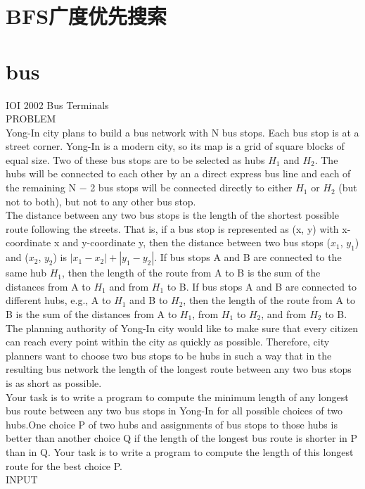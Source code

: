 \documentclass[12pt,twiside,a4paper]{ctexbook}
\numberwithin{chapter}{part}
\begin{document}
\section{BFS广度优先搜索}

\section{bus}
IOI 2002 Bus Terminals\\
PROBLEM\\
Yong-In city plans to build a bus network with N bus stops. Each bus stop is at a street corner. Yong-In is a modern city, so its map is a grid of square blocks of equal size. Two of these bus stops are to be selected as hubs $H_1$ and $H_2$. The hubs will be connected to each other by an a direct express bus line and each of the remaining N − 2 bus stops will be connected directly to either $H_1$ or $H_2$  (but not to both), but not to any other bus stop.\\
The distance between any two bus stops is the length of the shortest possible route following the streets. That is, if a bus stop is represented as (x, y) with x-coordinate x and y-coordinate y, then the distance between two bus stops ($x_1$, $y_1$) and ($x_2$, $y_2$) is $|x_1-x_2|+|y_1-y_2|$. If bus stops A and B are connected to the same hub $H_1$, then the length of the route from A to B is the sum of the distances from A to $H_1$ and from $H_1$ to B. If bus stops A and B are connected to different hubs, e.g., A to $H_1$ and B to $H_2$, then the length of the route from A to B is the sum of the distances from A to $H_1$, from $H_1$ to $H_2$, and from $H_2$ to B.\\
The planning authority of Yong-In city would like to make sure that every citizen can reach every point within the city as quickly as possible. Therefore, city planners want to choose two bus stops to be hubs in such a way that in the resulting bus network the length of the longest route between any two bus stops is as short as possible. \\
Your task is to write a program to compute the minimum length of any longest bus route between any two bus stops in Yong-In for all possible choices of two hubs.One choice P of two hubs and assignments of bus stops to those hubs is better than another choice Q if the length of the longest bus route is shorter in P than in Q.  Your task is to write a program to compute the length of this longest route for the best choice P. \\
INPUT\\
\end{document}
